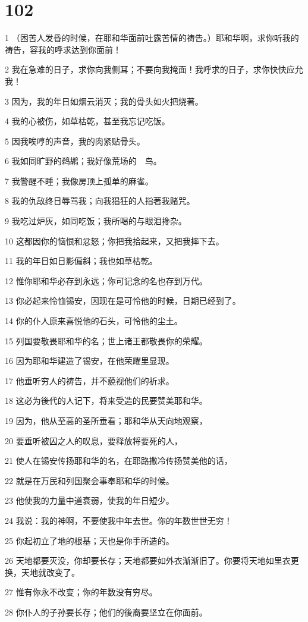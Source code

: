 \chapter{102}

\par 1 （困苦人发昏的时候，在耶和华面前吐露苦情的祷告。）耶和华啊，求你听我的祷告，容我的呼求达到你面前！
\par 2 我在急难的日子，求你向我侧耳；不要向我掩面！我呼求的日子，求你快快应允我！
\par 3 因为，我的年日如烟云消灭；我的骨头如火把烧著。
\par 4 我的心被伤，如草枯乾，甚至我忘记吃饭。
\par 5 因我唉哼的声音，我的肉紧贴骨头。
\par 6 我如同旷野的鹈鹕；我好像荒场的　鸟。
\par 7 我警醒不睡；我像房顶上孤单的麻雀。
\par 8 我的仇敌终日辱骂我；向我猖狂的人指著我赌咒。
\par 9 我吃过炉灰，如同吃饭；我所喝的与眼泪搀杂。
\par 10 这都因你的恼恨和忿怒；你把我拾起来，又把我摔下去。
\par 11 我的年日如日影偏斜；我也如草枯乾。
\par 12 惟你耶和华必存到永远；你可记念的名也存到万代。
\par 13 你必起来怜恤锡安，因现在是可怜他的时候，日期已经到了。
\par 14 你的仆人原来喜悦他的石头，可怜他的尘土。
\par 15 列国要敬畏耶和华的名；世上诸王都敬畏你的荣耀。
\par 16 因为耶和华建造了锡安，在他荣耀里显现。
\par 17 他垂听穷人的祷告，并不藐视他们的祈求。
\par 18 这必为後代的人记下，将来受造的民要赞美耶和华。
\par 19 因为，他从至高的圣所垂看；耶和华从天向地观察，
\par 20 要垂听被囚之人的叹息，要释放将要死的人，
\par 21 使人在锡安传扬耶和华的名，在耶路撒冷传扬赞美他的话，
\par 22 就是在万民和列国聚会事奉耶和华的时候。
\par 23 他使我的力量中道衰弱，使我的年日短少。
\par 24 我说：我的神啊，不要使我中年去世。你的年数世世无穷！
\par 25 你起初立了地的根基；天也是你手所造的。
\par 26 天地都要灭没，你却要长存；天地都要如外衣渐渐旧了。你要将天地如里衣更换，天地就改变了。
\par 27 惟有你永不改变；你的年数没有穷尽。
\par 28 你仆人的子孙要长存；他们的後裔要坚立在你面前。

